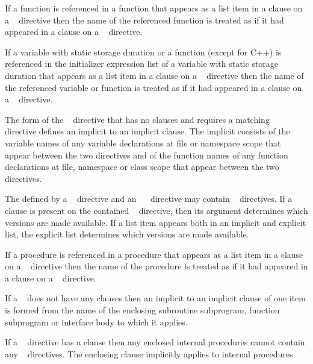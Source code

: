 \begin{ccppspecific}
If a function is referenced in a function that appears as a list item in a 
clause on a ~ directive then the name of the referenced 
function is treated as if it had appeared in a  clause on a 
~ directive.

If a variable with static storage duration or a function (except 
for C++) is referenced in the initializer expression list of a variable with
static storage duration that appears as a list item in a  clause on a 
~ directive then the name of the referenced variable 
or function is treated as if it had appeared in a  clause on a 
~ directive.

The form of the ~ directive that has no clauses
and requires a matching ~~ directive
defines an implicit  to an implicit 
clause. The implicit  consists of the variable names
of any variable declarations at file or namespace scope that appear between
the two directives and of the function names of any function declarations at
file, namespace or class scope that appear between the two directives.

The  defined by a
~ directive and an
~~ directive may contain
~ directives. If a  clause
is present on the contained ~ directive, then its
argument determines which versions are made available.
If a list item appears both in an implicit and explicit list, the explicit
list determines which versions are made available.

\end{ccppspecific}

\begin{fortranspecific}
If a procedure is referenced in a procedure that appears as a list item in a 
clause on a ~ directive then the name of the procedure is 
treated as if it had appeared in a  clause on a ~
directive.

If a ~ does not have any clauses then an implicit
 to an implicit  clause of one item is formed from
the name of the enclosing subroutine subprogram, function subprogram or
interface body to which it applies.

If a ~ directive has a
 clause then any enclosed internal procedures cannot contain 
any ~ directives. The enclosing  
clause implicitly applies to internal procedures. 
\end{fortranspecific}


